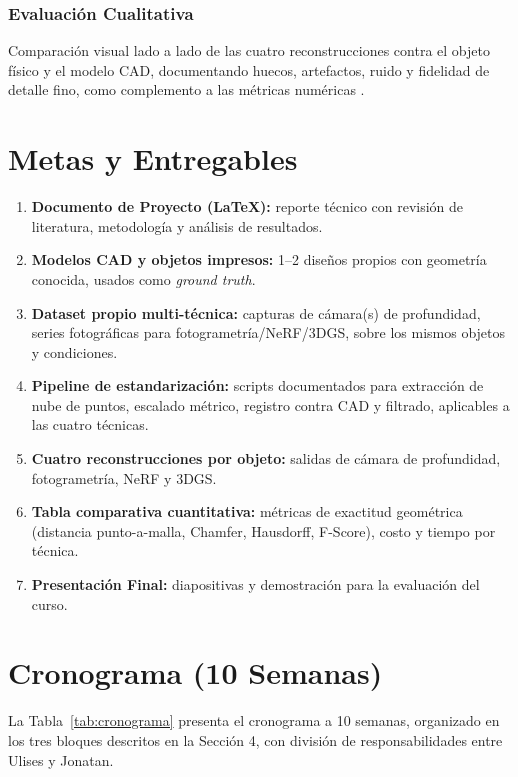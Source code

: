 \documentclass[11pt]{article}
\begin{document}
\subsubsection*{Evaluaci\'on Cualitativa}
Comparaci\'on visual lado a lado de las cuatro reconstrucciones contra el objeto f\'isico y el modelo CAD, documentando huecos, artefactos, ruido y fidelidad de detalle fino, como complemento a las m\'etricas num\'ericas \cite{low_cost_scanning}.

\section{Metas y Entregables}

\begin{enumerate}
    \item \textbf{Documento de Proyecto (LaTeX):} reporte t\'ecnico con revisi\'on de literatura, metodolog\'ia y an\'alisis de resultados.
    \item \textbf{Modelos CAD y objetos impresos:} 1--2 dise\~nos propios con geometr\'ia conocida, usados como \emph{ground truth}.
    \item \textbf{Dataset propio multi-t\'ecnica:} capturas de c\'amara(s) de profundidad, series fotogr\'aficas para fotogrametr\'ia/NeRF/3DGS, sobre los mismos objetos y condiciones.
    \item \textbf{Pipeline de estandarizaci\'on:} scripts documentados para extracci\'on de nube de puntos, escalado m\'etrico, registro contra CAD y filtrado, aplicables a las cuatro t\'ecnicas.
    \item \textbf{Cuatro reconstrucciones por objeto:} salidas de c\'amara de profundidad, fotogrametr\'ia, NeRF y 3DGS.
    \item \textbf{Tabla comparativa cuantitativa:} m\'etricas de exactitud geom\'etrica (distancia punto-a-malla, Chamfer, Hausdorff, F-Score), costo y tiempo por t\'ecnica.
    \item \textbf{Presentaci\'on Final:} diapositivas y demostraci\'on para la evaluaci\'on del curso.
\end{enumerate}

\section{Cronograma (10 Semanas)}

La Tabla~\ref{tab:cronograma} presenta el cronograma a 10 semanas, organizado en los tres bloques descritos en la Secci\'on 4, con divisi\'on de responsabilidades entre Ulises y Jonatan.
\end{document}
